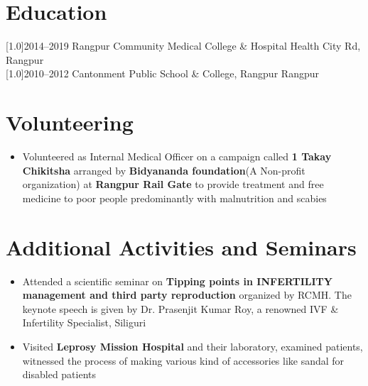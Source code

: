 \documentclass[english]{cv-style}     %
\begin{document}
\section{Education}
  \vspace{-0.2cm}
\begin{entrylist}
\vspace{-0.3cm}
\entry
{\scalebox{.8}[1.0]{2014--2019}}
{Rangpur Community Medical College \& Hospital}
{Health City Rd, Rangpur}
{\\
}
\vspace{-0.3cm}
\entry
{\scalebox{.8}[1.0]{2010--2012}}
{Cantonment Public School \& College, Rangpur}
{Rangpur}
{\\
}


\end{entrylist}
\vspace{-4mm}
\section{Volunteering}
  \vspace{-0.3cm}
  \begin{itemize}[label=\guillemotright]
      \item{Volunteered as Internal Medical Officer on a campaign called \textbf{1 Takay Chikitsha} arranged by \textbf{Bidyananda foundation}(A Non-profit organization) at \textbf{Rangpur Rail Gate} to provide treatment and free medicine to poor people predominantly with malnutrition and scabies}
      
  \end{itemize}

\vspace{-2mm}
\section{Additional Activities and Seminars}
  \vspace{-0.3cm}
\begin{itemize}[ label=\guillemotright]
    \item {Attended a scientific seminar on \textbf{Tipping points in INFERTILITY management and third party reproduction} organized by RCMH. The keynote speech is given by Dr. Prasenjit Kumar Roy, a renowned IVF \& Infertility Specialist, Siliguri}
    \item {Visited \textbf{Leprosy Mission Hospital} and their laboratory, examined patients, witnessed the process of making various kind of accessories like sandal for disabled patients}
\end{itemize}
\end{document}
